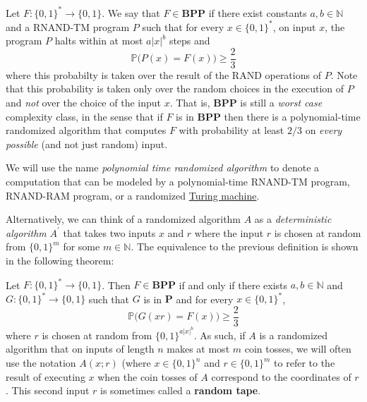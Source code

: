   \begin{definition}
    \label{def:the-class-bpp}
  Let $F: \{0, 1\}^* \to \{0,1\}$. We say that $F \in \mathbf{BPP}$ if there exist constants $a, b \in \mathbb{N}$ and a RNAND-TM program $P$ such that for every $x \in \{0,1\}^*$, on input $x$, the program $P$ halts within at most $a |x|^b$ steps and 
  \begin{equation}
    \mathbb{P} \big(P(x) = F(x)\big) \geq \frac{2}{3}
  \end{equation}
  where this probabilty is taken over the result of the RAND operations of $P$. Note that this probability is taken only over the random choices in the execution of $P$ and \textit{not} over the choice of the input $x$. That is, \textbf{BPP} is still a \textit{worst case} complexity class, in the sense that if $F$ is in \textbf{BPP} then there is a polynomial-time randomized algorithm that computes $F$ with probability at least $2/3$ on \textit{every possible} (and not just random) input. 
  \end{definition}

  We will use the name \textit{polynomial time randomized algorithm} to denote a computation that can be modeled by a polynomial-time RNAND-TM program, RNAND-RAM program, or a randomized \hyperref[def:turing-machine]{Turing machine}. 

  Alternatively, we can think of a randomized algorithm $A$ as a \textit{deterministic algorithm} $A^\prime$ that takes two inputs $x$ and $r$ where the input $r$ is chosen at random from $\{0, 1\}^m$ for some $m \in \mathbb{N}$. The equivalence to the previous definition is shown in the following theorem: 

  \begin{definition}
    \label{def:alternative-characterization-of-bpp}
  Let $F: \{0, 1\}^* \to \{0, 1\}$. Then $F \in \mathbf{BPP}$ if and only if there exists $a, b \in \mathbb{N}$ and $G: \{0, 1\}^* \to \{0, 1\}$ such that $G$ is in $\mathbf{P}$ and for every $x \in \{0, 1\}^*$, 
  \begin{equation}
    \mathbb{P}\big( G(xr) = F(x)\big) \geq \frac{2}{3}
  \end{equation}
  where $r$ is chosen at random from $\{0, 1\}^{a|x|^b}$. As such, if $A$ is a randomized algorithm that on inputs of length $n$ makes at most $m$ coin tosses, we will often use the notation $A(x; r)$ (where $x \in \{0, 1\}^n$ and $r \in \{0, 1\}^m$ to refer to the result of executing $x$ when the coin tosses of $A$ correspond to the coordinates of $r$. This second input $r$ is sometimes called a \textbf{random tape}.
  \end{definition}

